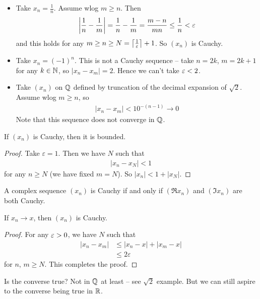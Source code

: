 \documentclass{../../template/note}
\begin{document}
    \begin{example*}
        \begin{itemize}
            \item Take \(x_n = \frac{1}{n}\). Assume wlog \(m \geq n\). Then
            \begin{align*}
                \left|\frac 1 n - \frac 1 m\right| = \frac 1 n - \frac 1 m = \frac{m-n}{mn} \leq \frac{1}{n} < \varepsilon
            \end{align*}
            and this holds for any \(m \geq n \geq N = \left\lceil\frac1 {\varepsilon}\right\rceil + 1\). So \((x_n)\) is Cauchy.
            \item Take \(x_n = (-1)^n\). This is not a Cauchy sequence -- take \(n = 2k\), \(m = 2k+1\) for any \(k \in \mathbb N\), so \(|x_n - x_m| = 2\). Hence we can't take \(\varepsilon < 2\).
            \item Take \((x_n)\) on \(\mathbb Q\) defined by truncation of the decimal expansion of \(\sqrt 2\). Assume wlog \(m \geq n\), so
            \begin{align*}
                \left|x_n - x_m\right| < 10^{-(n-1)} \to 0
            \end{align*}
            Note that this sequence does not converge in \(\mathbb Q\).
        \end{itemize}
    \end{example*}
    
    \begin{lemma}
        If \((x_n)\) is Cauchy, then it is bounded.
    \end{lemma}
    
    \begin{proof}
        Take \(\varepsilon = 1\). Then we have \(N\) such that
        \begin{align*}
            |x_n - x_N| < 1
        \end{align*}
        for any \(n \geq N\) (we have fixed \(m = N\)). So \(|x_n| < 1 + |x_N|\).
    \end{proof}
    
    \begin{lemma}
        A complex sequence \((x_n)\) is Cauchy if and only if \((\Re x_n)\) and \((\Im x_n)\) are both Cauchy.
    \end{lemma}    
    
    \begin{lemma}
        If \(x_n \to x\), then \((x_n)\) is Cauchy.
    \end{lemma}
    
    \begin{proof}
        For any \(\varepsilon > 0\), we have \(N\) such that
        \begin{align*}
            |x_n - x_m| &\leq |x_n - x| + |x_m - x| \\
            &\leq 2\varepsilon
        \end{align*}
        for \(n\), \(m \geq N\). This completes the proof.        
    \end{proof}
    Is the converse true? Not in \(\mathbb Q\) at least -- see \(\sqrt 2\) example. But we can still aspire to the converse being true in \(\mathbb R\).
\end{document}
